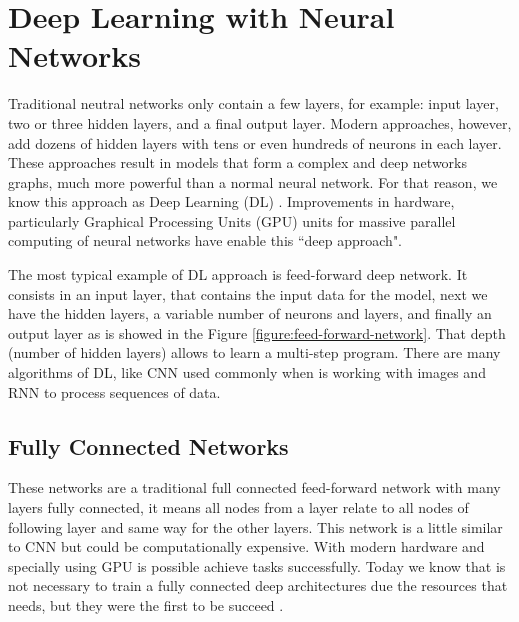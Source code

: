 \documentclass[12pt]{report}
\begin{document}
\section{Deep Learning with Neural Networks}

%

Traditional neutral networks only contain a few layers, for example: input layer, two or three hidden layers, and a final output layer. Modern approaches,
however, add dozens of hidden layers with tens or even hundreds of neurons in each layer. These approaches result in models that
form a complex and deep networks graphs, much more powerful  than a normal neural network. For that reason,  we know this approach as Deep Learning (DL) \cite{Chandra2017} \cite{Goodfellow2016} \cite{Nevala2017}. Improvements in hardware, particularly Graphical Processing Units (GPU) units for massive parallel computing of neural networks have enable this ``deep approach".

The most typical example of \ac{DL} approach is feed-forward deep network. It consists in an input layer, that contains the input data for the model, next we have the hidden layers, a variable number of neurons and layers, and finally an output layer as is showed in the Figure \ref{figure:feed-forward-network}. That depth (number of hidden layers) allows to learn a multi-step program. There are many algorithms of \ac{DL}, like \ac{CNN} used commonly when is working with images and \ac{RNN} to process sequences of data. 

\subsection{Fully Connected Networks}
These networks are a traditional full connected feed-forward network with many layers fully connected, it means all nodes from a layer relate to all nodes of following layer and same way for the other layers. This network is a little similar to \ac{CNN} but could be computationally expensive. With modern hardware and specially using \ac{GPU} is possible achieve tasks successfully. Today we know that is not necessary to train a fully connected deep architectures due the resources that needs, but they were the first to be succeed \cite{Goodfellow2016}.
\end{document}
